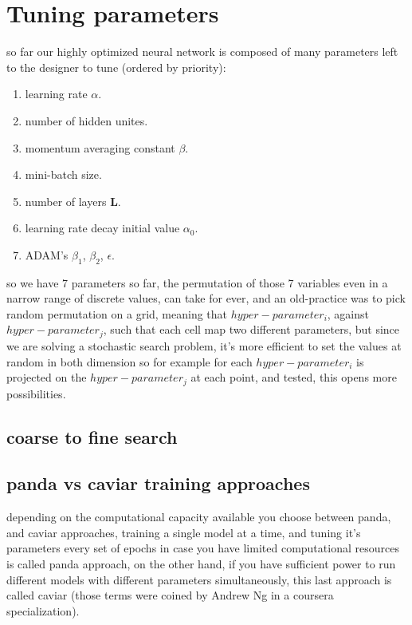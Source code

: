 \documentclass[4apaper,12pt]{book}
\begin{document}
\section{Tuning parameters}
\begin{description}
\item so far our highly optimized neural network is composed of many parameters left to the designer to tune (ordered by priority):
  \begin{enumerate}
\item learning rate \textbf{$\alpha$}.
\item number of hidden unites.
\item momentum averaging constant \textbf{$\beta$}.
\item mini-batch size.
\item number of layers \textbf{L}.
\item learning rate decay initial value \textbf{$\alpha_0$}.
\item ADAM's $\beta_1$, $\beta_2$, $\epsilon$.
  \end{enumerate}
\item so we have 7 parameters so far, the permutation of those 7 variables even in a narrow range of discrete values, can take for ever, and an old-practice was to pick random permutation on a grid, meaning that $hyper-parameter_i$, against $hyper-parameter_j$, such that each cell map two different parameters, but since we are solving a stochastic search problem, it's more efficient to set the values at random in both dimension so for example for each $hyper-parameter_i$  is projected on the $hyper-parameter_j$ at each point, and tested, this opens more possibilities.

 \subsection{coarse to fine search}
  \subsection{panda vs caviar training approaches}
  \begin{description}
  \item depending on the computational capacity available you choose between panda, and caviar approaches, training a single model at a time, and tuning it's parameters every set of epochs in case you have limited computational resources is called panda approach, on the other hand, if you have sufficient power to run different models with different parameters simultaneously, this last approach is called caviar (those terms were coined by Andrew Ng in a coursera specialization).
  \end{description}
  \end{description}
\end{document}
